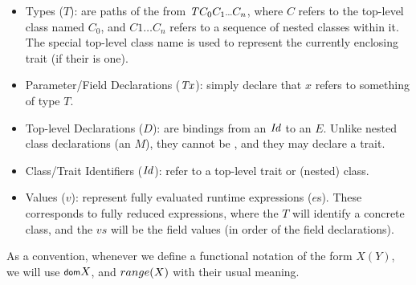 \begin{itemize}
	\item Types ($T$): are paths of the from $\T{C_0}{C_1}{\ldots}{C_n}$, where $C$ refers to the top-level class named $C_0$, and $C1 \ldots C_n$ refers to a sequence of nested classes within it. The special top-level class name \This is used to represent the currently enclosing trait (if their is one). 

	\item Parameter/Field Declarations ($\mathit{Tx}$): simply declare that $x$ refers to something of type $T$.
	
	\item Top-level Declarations ($D$):  are bindings from an $\mathit{Id}$ to an $E$. Unlike nested class declarations (an $M$), they cannot be , and they may declare a trait. 

	\item Class/Trait Identifiers ($\mathit{Id}$): refer to a top-level trait or (nested) class.
	
	\item Values ($v$): represent fully evaluated runtime expressions ($e$s). These corresponds to fully reduced  expressions, where the $T$ will identify a concrete class, and the $vs$ will be the field values (in order of the field declarations).	
\end{itemize}

As a convention, whenever we define a functional notation of the form $X(Y)$, we will use $\dom{X}$, and ${\footnotesize{{range}}({X})}$ with their usual meaning.

